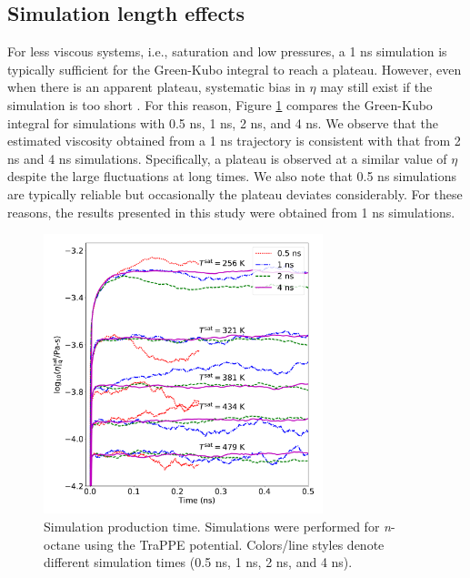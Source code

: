 \documentclass[preprint,review,12pt]{elsarticle}
\begin{document}
	\subsection{Simulation length effects}
	
	
	For less viscous systems, i.e., saturation and low pressures, a 1 ns simulation is typically sufficient for the Green-Kubo integral to reach a plateau. However, even when there is an apparent plateau, systematic bias in $\eta$ may still exist if the simulation is too short \cite{Maginn2018,Zhang2015}. For this reason, Figure \ref{fig:simulation_time} compares the Green-Kubo integral for simulations with 0.5 ns, 1 ns, 2 ns, and 4 ns. We observe that the estimated viscosity obtained from a 1 ns trajectory is consistent with that from 2 ns and 4 ns simulations. Specifically, a plateau is observed at a similar value of $\eta$ despite the large fluctuations at long times. We also note that 0.5 ns simulations are typically reliable but occasionally the plateau deviates considerably. For these reasons, the results presented in this study were obtained from 1 ns simulations.
	
	\begin{figure}[htb!]
		\centering
		\includegraphics[width=3.2in]{simulation_time}
		\caption{Simulation production time. Simulations were performed for \textit{n}-octane using the TraPPE potential. Colors/line styles denote different simulation times (0.5 ns, 1 ns, 2 ns, and 4 ns).}
		\label{fig:simulation_time}
	\end{figure} 
\end{document}
